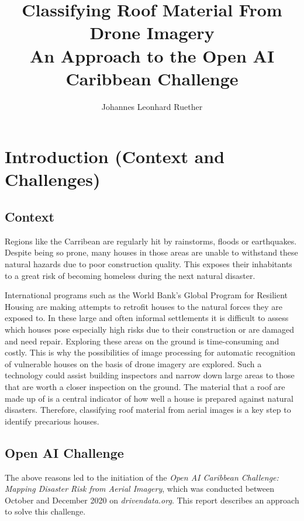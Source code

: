 \documentclass[11pt]{article}
\title{\bf{Classifying Roof Material From Drone Imagery} \\
 An Approach to the Open AI Caribbean Challenge}
\author{Johannes Leonhard Ruether}
\begin{document}
	\maketitle
	
	\section{Introduction (Context and Challenges)}
	
	\subsection{Context}
	
	Regions like the Carribean are regularly hit by rainstorms, floods or earthquakes. Despite being so prone, many houses in those areas are unable to withstand these natural hazards due to poor construction quality. This exposes their inhabitants to a great risk of becoming homeless during the next natural disaster. 
	
	International programs such as the World Bank's Global Program for Resilient Housing are making attempts to retrofit houses to the natural forces they are exposed to. In these large and often informal settlements it is difficult to assess which houses pose especially high risks due to their construction or are damaged and need repair. Exploring these areas on the ground is time-consuming and costly. 
	This is why the possibilities of image processing for automatic recognition of vulnerable houses on the basis of drone imagery are explored. Such a technology could assist building inspectors and narrow down large areas to those that are worth a closer inspection on the ground. 
	The material that a roof are made up of is a central indicator of how well a house is prepared against natural disasters. Therefore, classifying roof material from aerial images is a key step to identify precarious houses. \\
	
	\subsection{Open AI Challenge}
	
	The above reasons led to the initiation of the \textit{Open AI Caribbean Challenge: Mapping Disaster Risk from Aerial Imagery}, which was conducted between October and December 2020 on \textit{drivendata.org}.	
	This report describes an approach to solve this challenge.\\
	
\end{document}
